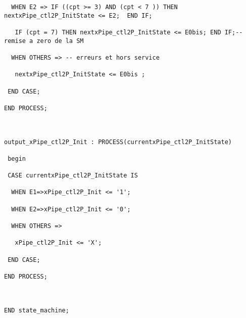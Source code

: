 \begin{verbatim}
  WHEN E2 => IF ((cpt >= 3) AND (cpt < 7 )) THEN nextxPipe_ctl2P_InitState <= E2;  END IF;

   IF (cpt = 7) THEN nextxPipe_ctl2P_InitState <= E0bis; END IF;-- remise a zero de la SM

  WHEN OTHERS => -- erreurs et hors service

   nextxPipe_ctl2P_InitState <= E0bis ;

 END CASE;

END PROCESS;



output_xPipe_ctl2P_Init : PROCESS(currentxPipe_ctl2P_InitState)

 begin

 CASE currentxPipe_ctl2P_InitState IS

  WHEN E1=>xPipe_ctl2P_Init <= '1'; 

  WHEN E2=>xPipe_ctl2P_Init <= '0'; 

  WHEN OTHERS =>

   xPipe_ctl2P_Init <= 'X';

 END CASE;

END PROCESS;



END state_machine;

\end{verbatim}

